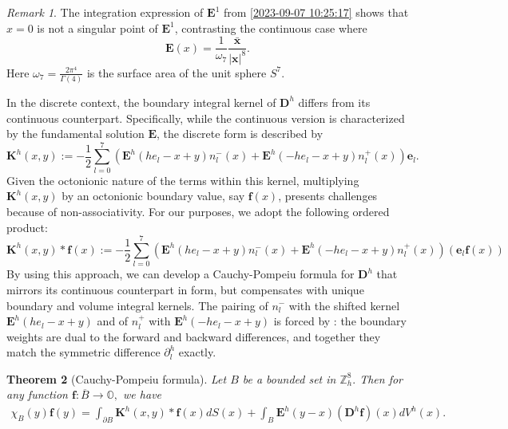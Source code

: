 \documentclass{amsart}
\newtheorem{theorem}{Theorem}[section]
\theoremstyle{definition}
\theoremstyle{remark}
\newtheorem{remark}[theorem]{Remark}
\numberwithin{equation}{section}
\newcommand{\p}{\partial}
\newcommand{\OO}{\mathbb O}
\newcommand{\Z}{\mathbb Z}
\newcommand{\f}{\bm{f}}
\newcommand{\e}{\bm{e}}
\newcommand{\E}{\bm{E}}
\begin{document}
\begin{remark}
   The integration expression of $\E^1 $ from  \eqref{2023-09-07 10:25:17} shows  that $x=0$ is not a singular point  of $\E^1$, contrasting the continuous case where
       \[
\E(x)=\frac{ 1}{\omega_7}\frac{\bm{\bar x}}{|\bm x|^8}.
\] Here  $\omega_7=\frac{2\pi^{4}}{\Gamma(4)}$ is the surface area of the unit sphere $S^7$.
\end{remark}






In the discrete context, the boundary integral kernel of $\bm D^h$
differs from its continuous counterpart. Specifically, while the continuous version is characterized by the fundamental solution $\E$, the discrete form is described by
 \begin{equation}
        \label{2023-09-07 16:01:11}
        \bm K^h(x,y):= -\frac{1}{2}\sum\limits_{l=0}^7 \left(\E^h(he_l-x+y)n_l^-(x)+\E^h(-he_l-x+y)n_l^+(x)\right)\e_l.
    \end{equation}
Given the octonionic nature of the terms within this kernel, multiplying $\bm K^h(x,y)$ by an octonionic boundary value, say \(\f(x)\), presents challenges because of non-associativity. For our purposes, we adopt the following ordered product:
  \begin{equation}
	\label{2023-09-07 21:56:06}
	\bm  K^h(x,y)*\f(x) := -\frac{1}{2}\sum\limits_{l=0}^7 \left(\E^h(he_l-x+y)n_l^-(x)+\E^h(-he_l-x+y)n_l^+(x)\right)(\e_l \f(x))
\end{equation}
 By using this approach, we can develop a Cauchy-Pompeiu formula for
$\bm D^h$
 that mirrors its continuous counterpart in form, but compensates with unique boundary and volume integral kernels. The pairing of $n_l^{-}$ with the shifted kernel $\E^h(he_l-x+y)$ and of $n_l^{+}$ with $\E^h(-he_l-x+y)$ is forced by : the boundary weights are dual to the forward and backward differences, and together they match the symmetric difference $\p_l^h$ exactly.


 \begin{theorem}[Cauchy-Pompeiu formula]\label{thm:cauchy-pompeiu}\label{2023-09-11 19:15:35}
 	Let $B$ be a bounded set in $\Z^8_h.$ Then for any function $\f:\overline B\longrightarrow  \OO,$ we have \begin{equation}
 		\begin{aligned}
 			\chi_B(y)\f(y)=\int_{\p B}\bm K^h(x,y) * \f(x)dS(x)+ \int_B \E^h(y-x)(\bm D^h \f)(x)dV^h(x)  .
 		\end{aligned}
 	\end{equation}
 \end{theorem}
\end{document}
